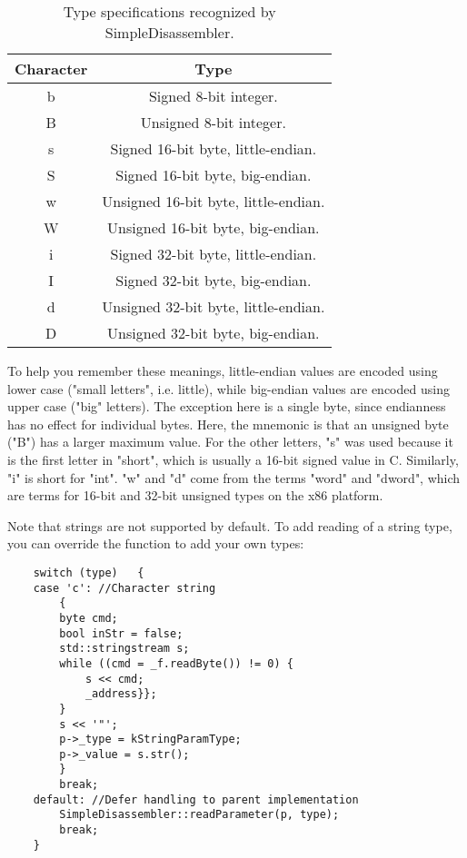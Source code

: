 \begin{table}[!hpbt]
\centering
\begin{tabular}{c | c}
Character & Type \\
\hline
b & Signed 8-bit integer. \\
B & Unsigned 8-bit integer. \\
s & Signed 16-bit byte, little-endian. \\
S & Signed 16-bit byte, big-endian. \\
w & Unsigned 16-bit byte, little-endian. \\
W & Unsigned 16-bit byte, big-endian. \\
i & Signed 32-bit byte, little-endian. \\
I & Signed 32-bit byte, big-endian. \\
d & Unsigned 32-bit byte, little-endian. \\
D & Unsigned 32-bit byte, big-endian. \\
\end{tabular}
\caption{Type specifications recognized by SimpleDisassembler.}
\label{tbl:paramtypes}
\end{table}

To help you remember these meanings, little-endian values are encoded using lower case ("small letters", i.e. little), while big-endian values are encoded using upper case ("big" letters). The exception here is a single byte, since endianness has no effect for individual bytes. Here, the mnemonic is that an unsigned byte ("B") has a larger maximum value. For the other letters, "s" was used because it is the first letter in "short", which is usually a 16-bit signed value in C. Similarly, "i" is short for "int". "w" and "d" come from the terms "word" and "dword", which are terms for 16-bit and 32-bit unsigned types on the x86 platform.

Note that strings are not supported by default. To add reading of a string type, you can override the  function to add your own types:

\begin{C++}
\begin{lstlisting}
	switch (type)	{
	case 'c': //Character string
		{
		byte cmd;
		bool inStr = false;
		std::stringstream s;
		while ((cmd = _f.readByte()) != 0) {
			s << cmd;
			_address}};
		}
		s << '"';
		p->_type = kStringParamType;
		p->_value = s.str();
		}
		break;
	default: //Defer handling to parent implementation
		SimpleDisassembler::readParameter(p, type);
		break;
	}
\end{lstlisting}
\end{C++}

